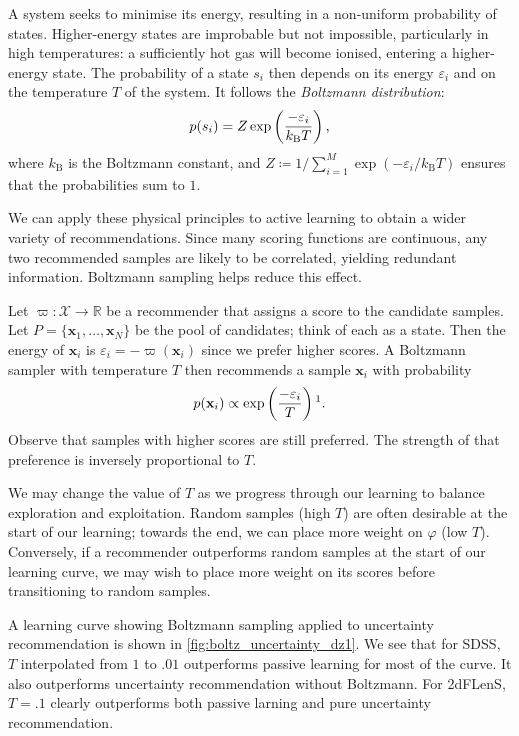 \documentclass[11pt,twoside,openright]{report}
\newcommand\bbR{\mathbb{R}}
\newcommand\bx{\mathbf{x}}
\newcommand\cX{\mathcal{X}}
\begin{document}
A system seeks to minimise its energy, resulting in a non-uniform probability of states. Higher-energy states are improbable but not impossible, particularly in high temperatures: a sufficiently hot gas will become ionised, entering a higher-energy state. The probability of a state $s_i$ then depends on its energy $\varepsilon_i$ and on the temperature $T$ of the system. It follows the \textit{Boltzmann distribution}:\[
  p(s_i) = Z\exp\left(\frac{-\varepsilon_i}{k_\mathrm{B}T}\right) \text,
\] where $k_\mathrm{B}$ is the Boltzmann constant, and $Z \coloneqq 1/\sum^{M}_{i=1}\exp(-\varepsilon_i/k_\mathrm{B}T)$ ensures that the probabilities sum to $1$.

We can apply these physical principles to active learning to obtain a wider variety of recommendations. Since many scoring functions are continuous, any two recommended samples are likely to be correlated, yielding redundant information. Boltzmann sampling helps reduce this effect.

Let $\varpi : \cX \to \bbR$ be a recommender that assigns a score to the candidate samples. Let $P = \{\bx_1, \dots, \bx_N\}$ be the pool of candidates; think of each as a state. Then the energy of $\bx_i$ is $\varepsilon_i = -\varpi(\bx_i)$ since we prefer higher scores. A Boltzmann sampler with temperature $T$ then recommends a sample $\bx_i$ with probability \[
  p(\bx_i) \propto \exp\left(\frac{-\varepsilon_i}{T}\right) \text{\footnotemark}.
\] Observe that samples with higher scores are still preferred. The strength of that preference is inversely proportional to $T$.

We may change the value of $T$ as we progress through our learning to balance exploration and exploitation. Random samples (high $T$) are often desirable at the start of our learning; towards the end, we can place more weight on $\varphi$ (low $T$). Conversely, if a recommender outperforms random samples at the start of our learning curve, we may wish to place more weight on its scores before transitioning to random samples.

A learning curve showing Boltzmann sampling applied to uncertainty recommendation is shown in \cref{fig:boltz_uncertainty_dz1}. We see that for SDSS, $T$ interpolated from $1$ to $.01$ outperforms passive learning for most of the curve. It also outperforms uncertainty recommendation without Boltzmann. For 2dFLenS, $T=.1$ clearly outperforms both passive larning and pure uncertainty recommendation.
\end{document}
